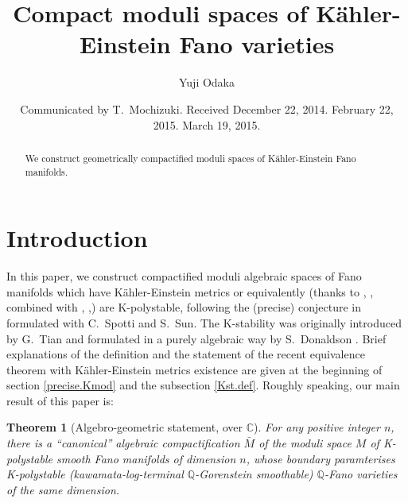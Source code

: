 \documentclass[12pt]{amsart}
\newtheorem{Thm}{Theorem}[section]
\theoremstyle{remark}
\theoremstyle{definition}
\begin{document}
\title[K-moduli of Fano varieties]
{Compact moduli spaces of K\"ahler-Einstein Fano varieties}

\author{Yuji Odaka}
\date{Communicated by T.~Mochizuki. Received December 22, 2014. 
February 22, 2015. March 19, 2015. }
\address{Department of Mathematics, Faculty of Science, 
Kyoto University, Kyoto 606-8502, Japan}

\maketitle

\begin{abstract}
We construct geometrically compactified moduli spaces of 
K\"ahler-Einstein Fano manifolds. 
\end{abstract}

\section{Introduction}

In this paper, we construct 
compactified moduli algebraic spaces of Fano manifolds which have 
K\"ahler-Einstein metrics or equivalently 
(thanks to \cite{CDS}, \cite{Tia2}, combined with \cite{Ber},
\cite{Mab1},\cite{Mab2}) 
are K-polystable, following the (precise) conjecture in \cite{OSS} 
formulated with C.~Spotti and S.~Sun. 
The K-stability was originally introduced by G.~Tian \cite{Tia} 
and formulated in a purely algebraic way by S.~Donaldson \cite{Don0}. 
Brief explanations of the definition and the statement of the recent equivalence theorem 
with K\"ahler-Einstein metrics existence 
are given at the beginning of section \ref{precise.Kmod} and the subsection \ref{Kst.def}. 
Roughly speaking, our main result of this paper is: 

\begin{Thm}[Algebro-geometric statement, over $\mathbb{C}$]\label{Main.rough}
For any positive integer $n$, 
there is a ``canonical'' algebraic compactification $\bar{M}$ of 
the moduli space $M$ of K-polystable smooth 
Fano manifolds of dimension $n$, whose boundary paramterises K-polystable 
(kawamata-log-terminal $\mathbb{Q}$-Gorenstein smoothable) 
$\mathbb{Q}$-Fano varieties of the same dimension. 
\end{Thm}
\end{document}
